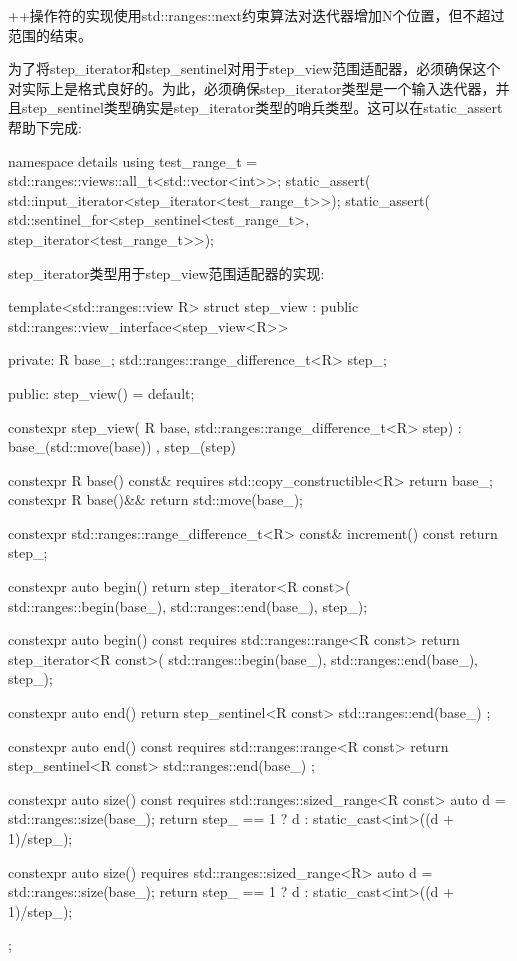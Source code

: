 ++操作符的实现使用std::ranges::next约束算法对迭代器增加N个位置，但不超过范围的结束。

为了将step\_iterator和step\_sentinel对用于step\_view范围适配器，必须确保这个对实际上是格式良好的。为此，必须确保step\_iterator类型是一个输入迭代器，并且step\_sentinel类型确实是step\_iterator类型的哨兵类型。这可以在static\_assert帮助下完成:

\begin{cpp}
namespace details
{
	using test_range_t =
		std::ranges::views::all_t<std::vector<int>>;
	static_assert(
		std::input_iterator<step_iterator<test_range_t>>);
	static_assert(
		std::sentinel_for<step_sentinel<test_range_t>,
		step_iterator<test_range_t>>);
}
\end{cpp}

step\_iterator类型用于step\_view范围适配器的实现:

\begin{cpp}
template<std::ranges::view R>
struct step_view :
	public std::ranges::view_interface<step_view<R>>
{
private:
	R base_;
	std::ranges::range_difference_t<R> step_;
	
public:
	step_view() = default;
	
	constexpr step_view(
		R base,
		std::ranges::range_difference_t<R> step)
			: base_(std::move(base))
			, step_(step)
	{
	}

	constexpr R base() const&
		requires std::copy_constructible<R>
	{ return base_; }
	constexpr R base()&& { return std::move(base_); }
	
	constexpr std::ranges::range_difference_t<R> const&
	increment() const
	{ return step_; }
	
	constexpr auto begin()
	{
		return step_iterator<R const>(
			std::ranges::begin(base_),
			std::ranges::end(base_), step_);
	}

	constexpr auto begin() const
	requires std::ranges::range<R const>
	{
		return step_iterator<R const>(
			std::ranges::begin(base_),
			std::ranges::end(base_), step_);
	}

	constexpr auto end()
	{
		return step_sentinel<R const>{
			std::ranges::end(base_) };
	}

	constexpr auto end() const
	requires std::ranges::range<R const>
	{
		return step_sentinel<R const>{
			std::ranges::end(base_) };
	}

	constexpr auto size() const
	requires std::ranges::sized_range<R const>
	{
		auto d = std::ranges::size(base_);
		return step_ == 1 ? d :
			static_cast<int>((d + 1)/step_); 
	}
	
	constexpr auto size()
	requires std::ranges::sized_range<R>
	{
		auto d = std::ranges::size(base_);
		return step_ == 1 ? d :
			static_cast<int>((d + 1)/step_);
	}
};
\end{cpp}

